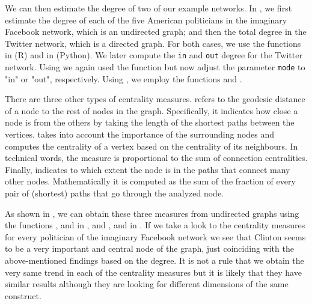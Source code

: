 We can then estimate the degree of two of our example networks. In , we first estimate the degree of each of the five American politicians in the imaginary Facebook network, which is an undirected graph; and then the total degree in the Twitter network, which is a directed graph. For both cases, we use the functions  in  (R) and  in  (Python). We later compute the \texttt{in} and \texttt{out} degree for the Twitter network. Using  we again used the function  but now adjust the parameter \texttt{mode} to "in" or "out", respectively. Using , we employ the functions  and .


There are three other types of centrality measures.  refers to the geodesic distance of a node to the rest of nodes in the graph. Specifically, it indicates how close a node is from the others by taking the length of the shortest paths between the vertices.  takes into account the importance of the surrounding nodes and computes the centrality of a vertex based on the centrality of its neighbours. In technical words, the measure is proportional to the sum of connection centralities. Finally,  indicates to which extent the node is in the paths that connect many other nodes. Mathematically it is computed as the sum of the fraction of every pair of (shortest) paths that go through the analyzed node. 

As shown in , we can obtain these three measures from undirected graphs using the functions ,  and  in , and ,  and  in . If we take a look to the centrality measures for every politician of the imaginary Facebook network we see that Clinton seems to be a very important and central node of the graph, just coinciding with the above-mentioned findings based on the degree. It is not a rule that we obtain the very same trend in each of the centrality measures but it is likely that they have similar results although they are looking for different dimensions of the same construct.


